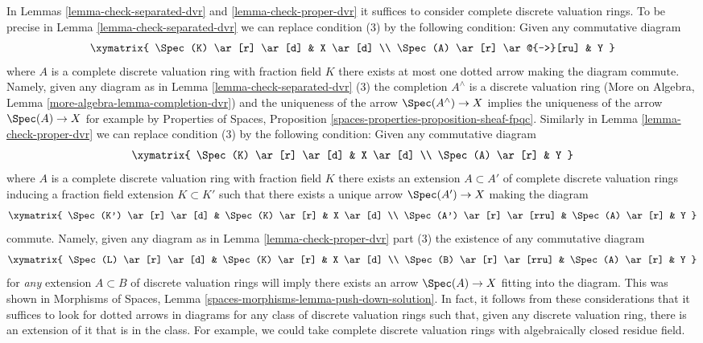 \begin{remark}
\label{remark-variant}
In Lemmas \ref{lemma-check-separated-dvr} and \ref{lemma-check-proper-dvr}
it suffices to consider complete discrete valuation rings.
To be precise in Lemma \ref{lemma-check-separated-dvr} we can replace
condition (3) by the following condition: Given any commutative diagram
$$
\xymatrix{
\Spec(K) \ar[r] \ar[d] & X \ar[d] \\
\Spec(A) \ar[r] \ar@{-->}[ru] & Y
}
$$
where $A$ is a complete discrete valuation ring with fraction field $K$
there exists at most one dotted arrow making the diagram commute. Namely, given
any diagram as in Lemma \ref{lemma-check-separated-dvr} (3)
the completion $A^\wedge$ is a discrete valuation ring
(More on Algebra, Lemma \ref{more-algebra-lemma-completion-dvr})
and the uniqueness of the arrow $\Spec(A^\wedge) \to X$
implies the uniqueness of the arrow $\Spec(A) \to X$
for example by Properties of Spaces, Proposition
\ref{spaces-properties-proposition-sheaf-fpqc}.
Similarly in Lemma \ref{lemma-check-proper-dvr}
we can replace condition (3) by the following condition:
Given any commutative diagram
$$
\xymatrix{
\Spec(K) \ar[r] \ar[d] & X \ar[d] \\
\Spec(A) \ar[r] & Y
}
$$
where $A$ is a complete discrete valuation ring with fraction field $K$
there exists an extension $A \subset A'$ of complete discrete valuation rings
inducing a fraction field extension $K \subset K'$ such that there exists a
unique arrow $\Spec(A') \to X$ making the diagram
$$
\xymatrix{
\Spec(K') \ar[r] \ar[d] & \Spec(K) \ar[r] & X \ar[d] \\
\Spec(A') \ar[r] \ar[rru] & \Spec(A) \ar[r] & Y
}
$$
commute. Namely, given any diagram as in Lemma \ref{lemma-check-proper-dvr}
part (3) the existence of any commutative diagram
$$
\xymatrix{
\Spec(L) \ar[r] \ar[d] & \Spec(K) \ar[r] & X \ar[d] \\
\Spec(B) \ar[r] \ar[rru] & \Spec(A) \ar[r] & Y
}
$$
for {\it any} extension $A \subset B$ of discrete valuation rings
will imply there exists an arrow $\Spec(A) \to X$ fitting into
the diagram. This was shown in
Morphisms of Spaces, Lemma \ref{spaces-morphisms-lemma-push-down-solution}.
In fact, it follows from these considerations that it suffices to look
for dotted arrows in diagrams for any class of discrete valuation rings
such that, given any discrete valuation ring, there is an extension of it
that is in the class. For example, we could take complete discrete valuation
rings with algebraically closed residue field.
\end{remark}







